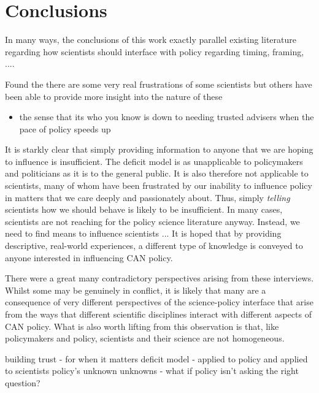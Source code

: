 \chapter{Conclusions}\label{ch:conclusions}

In many ways, the conclusions of this work exactly parallel existing literature regarding how scientists should interface with policy regarding timing, framing, ....

Found the there are some very real frustrations of some scientists but others have been able to provide more insight into the nature of these

\begin{itemize}
    \item the sense that its who you know is down to needing trusted advisers when the pace of policy speeds up 
    
\end{itemize}

It is starkly clear that simply providing information to anyone that we are hoping to influence is insufficient. The deficit model is as unapplicable to policymakers and politicians as it is to the general public. It is also therefore not applicable to scientists, many of whom have been frustrated by our inability to influence policy in matters that we care deeply and passionately about. Thus, simply \emph{telling} scientists how we should behave is likely to be insufficient. In many cases, scientists are not reaching for the policy science literature anyway. Instead, we need to find means to influence scientists ... It is hoped that by providing descriptive, real-world experiences, a different type of knowledge is conveyed to anyone interested in influencing CAN policy. 

There were a great many contradictory perspectives arising from these interviews. Whilst some may be genuinely in conflict, it is likely that many are a consequence of very different perspectives of the science-policy interface that arise from the ways that different scientific disciplines interact with different aspects of CAN policy. What is also worth lifting from this observation is that, like policymakers and policy, scientists and their science are not homogeneous.   


building trust - for when it matters
deficit model - applied to policy and applied to scientists
policy's unknown unknowns - what if policy isn't asking the right question?
